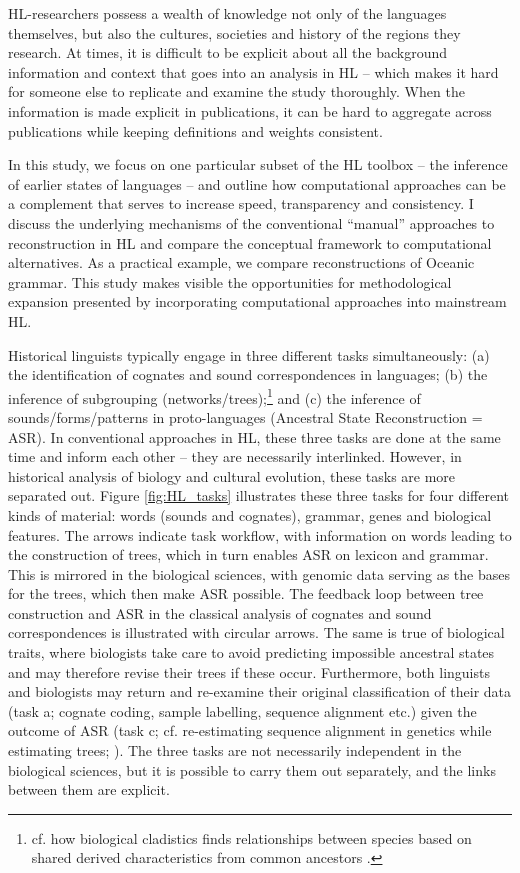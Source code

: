 \documentclass[12pt,letterpaper]{article}
\begin{document}
HL-researchers possess a wealth of knowledge not only of the languages themselves, but also the cultures, societies and history of the regions they research. At times, it is difficult to be explicit about all the background information and context that goes into an analysis in HL -- which makes it hard for someone else to replicate and examine the study thoroughly. When the information is made explicit in publications, it can be hard to aggregate across publications while keeping definitions and weights consistent.

In this study, we focus on one particular subset of the HL toolbox -- the inference of earlier states of languages -- and outline how computational approaches can be a complement that serves to increase speed, transparency and consistency. I discuss the underlying mechanisms of the conventional ``manual'' approaches to reconstruction in HL and compare the conceptual framework to computational alternatives. As a practical example, we compare reconstructions of Oceanic grammar. This study makes visible the opportunities for methodological expansion presented by incorporating computational approaches into mainstream HL.

Historical linguists typically engage in three different tasks simultaneously: (a) the identification of cognates and sound correspondences in languages; (b) the inference of subgrouping (networks/trees);\footnote{cf. how biological cladistics finds relationships between species based on shared derived characteristics from common ancestors \citep[16--17]{maclaurin2008biodiversity}.} and (c) the inference of sounds/forms/patterns in proto-languages (Ancestral State Reconstruction = ASR). In conventional approaches in HL, these three tasks are done at the same time and inform each other -- they are necessarily interlinked. However, in historical analysis of biology and cultural evolution, these tasks are more separated out. Figure \ref{fig:HL_tasks} illustrates these three tasks for four different kinds of material: words (sounds and cognates), grammar, genes and biological features. The arrows indicate task workflow, with information on words leading to the construction of trees, which in turn enables ASR on lexicon and grammar. This is mirrored in the biological sciences, with genomic data serving as the bases for the trees, which then make ASR possible. The feedback loop between tree construction and ASR in the classical analysis of cognates and sound correspondences is illustrated with circular arrows. The same is true of biological traits, where biologists take care to avoid predicting impossible ancestral states \citep{schulmeister2004comparative} and may therefore revise their trees if these occur. Furthermore, both linguists and biologists may return and re-examine their original classification of their data (task a; cognate coding, sample labelling, sequence alignment etc.) given the outcome of ASR (task c; cf. re-estimating sequence alignment in genetics while estimating trees; \citealt{10.1093/bioinformatics/btab129}). The three tasks are not necessarily independent in the biological sciences, but it is possible to carry them out separately, and the links between them are explicit. 
\end{document}
